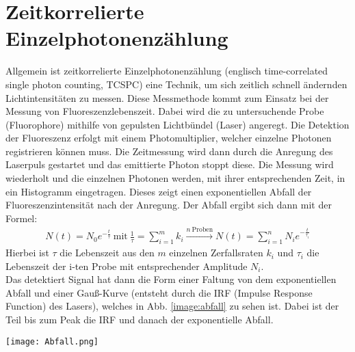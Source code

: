 \section{Zeitkorrelierte Einzelphotonenzählung}
Allgemein ist zeitkorrelierte Einzelphotonenzählung (englisch time-correlated single photon counting, TCSPC) eine Technik, um sich zeitlich schnell ändernden Lichtintensitäten zu messen. Diese Messmethode kommt zum Einsatz bei der Messung von Fluoreszenzlebenszeit. Dabei wird die zu untersuchende Probe (Fluorophore) mithilfe von gepulsten Lichtbündel (Laser) angeregt. Die Detektion der Fluoreszenz erfolgt mit einem Photomultiplier, welcher einzelne Photonen registrieren können muss. Die Zeitmessung wird dann durch die Anregung des Laserpuls gestartet und das emittierte Photon stoppt diese. Die Messung wird wiederholt und die einzelnen Photonen werden, mit ihrer entsprechenden Zeit, in ein Histogramm eingetragen. Dieses zeigt einen exponentiellen Abfall der Fluoreszenzintensität nach der Anregung. Der Abfall ergibt sich dann mit der Formel:
\begin{gather}
    N(t) = N_0e^{-\frac{t}{\tau}}~\text{mit}~\frac{1}{\tau} = \sum^m_{i=1} k_i \xrightarrow{n~\text{Proben}} N(t) = \sum_{i=1}^n N_ie^{-\frac{t}{\tau_i}} 
\end{gather} 
Hierbei ist $\tau$ die Lebenszeit aus den $m$ einzelnen Zerfallsraten $k_i$ und $\tau_i$ die Lebenszeit der i-ten Probe mit entsprechender Amplitude $N_i$.\\
Das detektiert Signal hat dann die Form einer Faltung von dem exponentiellen Abfall und einer Gauß-Kurve (entsteht durch die IRF (Impulse Response Function) des Lasers), welches in Abb. \ref{image:abfall} zu sehen ist. Dabei ist der Teil bis zum Peak die IRF und danach der exponentielle Abfall.
\begin{center}
    \texttt{[image: Abfall.png]}
    \label{image:abfall}
\end{center}
\newpage
